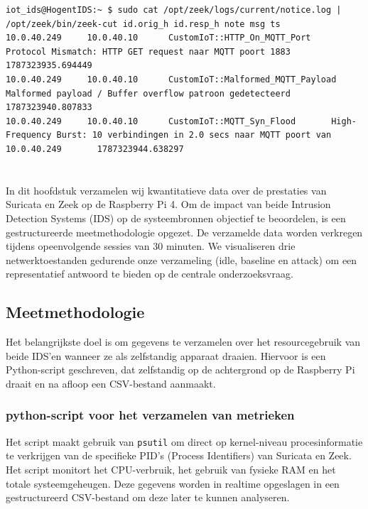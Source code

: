 \begin{listing}[H]
\begin{verbatim}
iot_ids@HogentIDS:~ $ sudo cat /opt/zeek/logs/current/notice.log | /opt/zeek/bin/zeek-cut id.orig_h id.resp_h note msg ts
10.0.40.249     10.0.40.10      CustomIoT::HTTP_On_MQTT_Port    Protocol Mismatch: HTTP GET request naar MQTT poort 1883        1787323935.694449
10.0.40.249     10.0.40.10      CustomIoT::Malformed_MQTT_Payload       Malformed payload / Buffer overflow patroon gedetecteerd        1787323940.807833
10.0.40.249     10.0.40.10      CustomIoT::MQTT_Syn_Flood       High-Frequency Burst: 10 verbindingen in 2.0 secs naar MQTT poort van 10.0.40.249       1787323944.638297
\end{verbatim}
\caption{Uitvoer van \texttt{notice.log} tijdens de actieve validatie van Zeek custom scripts.}
\label{lst:zeek-notice-log}
\end{listing}




\chapter{}%
\label{ch:Verzamelen en analyseren van meetgegevens}
In dit hoofdstuk verzamelen wij kwantitatieve data over de prestaties van Suricata en Zeek op de Raspberry Pi 4. Om de impact van beide Intrusion Detection Systems (IDS) op de systeembronnen objectief te beoordelen, is een gestructureerde meetmethodologie opgezet. De verzamelde data worden verkregen tijdens opeenvolgende sessies van 30 minuten. We visualiseren drie netwerktoestanden gedurende onze verzameling (idle, baseline en attack) om een representatief antwoord te bieden op de centrale onderzoeksvraag.



\section{Meetmethodologie}
Het belangrijkste doel is om gegevens te verzamelen over het resourcegebruik van beide IDS’en wanneer ze als zelfstandig apparaat draaien. Hiervoor is een Python-script geschreven, dat zelfstandig op de achtergrond op de Raspberry Pi draait en na afloop een CSV-bestand aanmaakt.


\subsection{python-script voor het verzamelen van metrieken}
Het script maakt gebruik van \texttt{psutil} om direct op kernel-niveau procesinformatie te verkrijgen van de specifieke PID’s (Process Identifiers) van Suricata en Zeek. Het script monitort het CPU-verbruik, het gebruik van fysieke RAM en het totale systeemgeheugen. Deze gegevens worden in realtime opgeslagen in een gestructureerd CSV-bestand om deze later te kunnen analyseren.


